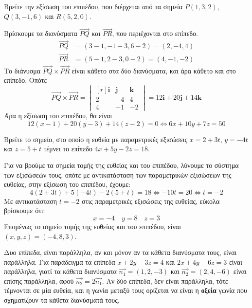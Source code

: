  \enlargethispage{\baselineskip}

 \begin{example}
   Βρείτε την εξίσωση του επιπέδου, που διέρχεται από τα σημεία 
   $ P(1,3,2) $, $ Q(3,-1,6) $ και $R(5,2,0) $.
 \end{example}
 \begin{solution}
   Βρίσκουμε τα διανύσματα $ \vec{PQ} $ και $ \vec{PR} $, που περιέχονται στο επίπεδο.
   \begin{align*}
     \vec{PQ} &= (3-1,-1-3,6-2) = (2,-4,4) \\
     \vec{PR} &= (5-1,2-3,0-2) = (4,-1,-2)
   \end{align*} 
   Το διάνυσμα $ \vec{PQ} \times \vec{PR} $ είναι κάθετο στα δύο διανύσματα, και άρα 
   κάθετο και στο επίπεδο. Οπότε
   \[
     \vec{PQ} \times \vec{PR} = 
     \begin{vmatrix*}[r]
       \mathbf{i} & \mathbf{j} & \mathbf{k} \\
       2 & -4 & 4 \\
       4 & -1 & -2
     \end{vmatrix*} = 12 \mathbf{i} + 20 \mathbf{j} + 14 \mathbf{k}
    \] 
    Άρα η εξίσωση του επιπέδου, θα είναι 
    \[
      12(x-1) + 20(y-3) + 14(z-2) = 0 \Leftrightarrow 6x+10y+7z=50
    \]
 \end{solution}

 \pagebreak

 \begin{example}
   Βρείτε το σημείο, στο οποίο η ευθεία με παραμετρικές εξισώσεις $ x=2+3t $, $ y=-4t
   $ και $ z=5+t $ τέμνει το επίπεδο $ 4x+5y-2z=18 $.
 \end{example}
 \begin{solution}
   Για να βρούμε τα σημεία τομής της ευθείας και του επιπέδου, λύνουμε το σύστημα των 
   εξισώσεών τους, οπότε με αντικατάσταση των παραμετρικών εξισώσεων της ευθείας, 
   στην εξίσωση του επιπέδου, έχουμε:
   \[
     4(2+3t) + 5(-4t) -2(5+t) = 18 \Leftrightarrow -10t=20 \Leftrightarrow t=-2 
   \] 
   Με αντικατάσταση $ t=-2 $ στις παραμετρικές εξισώσεις της ευθείας, εύκολα 
   βρίσκουμε ότι:
   \[
     x=-4 \quad y=8 \quad z=3
   \] 
   Επομένως το σημείο τομής της ευθείας και του επιπέδου, είναι $ (x,y,z) = (-4,8,3) $.
 \end{solution}

 \begin{rem}
   Δυο επίπεδα, είναι \textcolor{Col1}{παράλληλα}, αν και μόνον αν τα κάθετα διανύσματα 
   τους, είναι παράλληλα. Για παράδειγμα τα επίπεδα $ x+2y-3z=4 $ και $ 2x+4y-6z=3 $ 
   είναι παράλληλα, γιατί τα κάθετα διανύσματα $ \vec{n_{1}} = (1,2,-3) $ και 
   $ \vec{n_{2}} = (2,4,-6) $ είναι επίσης παράλληλα, αφού 
   $ \vec{n_{2}} = 2 \vec{n_{1}} $. Αν δύο επίπεδα, δεν είναι παράλληλα, τότε τέμνονται 
   σε μία ευθεία, και η \textcolor{Col1}{γωνία} μεταξύ τους ορίζεται να είναι η 
   \textbf{οξεία} γωνία που σχηματίζουν τα κάθετα διανύσματά τους.
 \end{rem}

